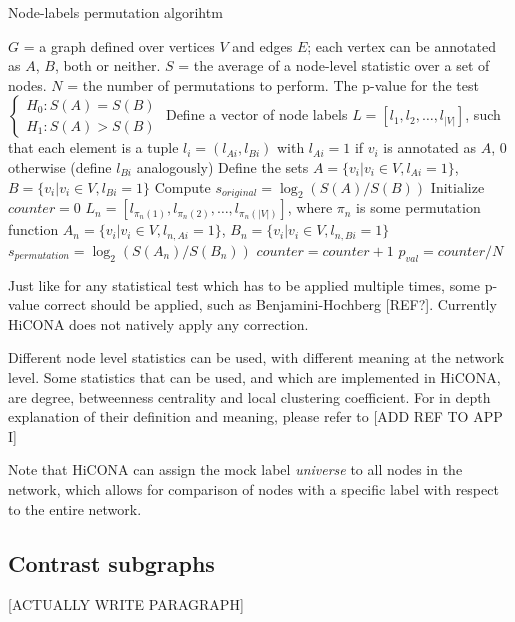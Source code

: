 \begin{algorithm}
\caption{Node-labels permutation algorihtm}\label{alg:labelPermutations}
\begin{algorithmic}[1]
\Require $G$ = a graph defined over vertices $V$ and edges $E$; each vertex can be annotated as $A$, $B$, both or neither. $S$ = the average of a node-level statistic over a set of nodes. $N$ = the number of permutations to perform.
\Ensure The p-value for the test $\begin{cases} H_0: S(A) = S(B) \\ H_1: S(A) > S(B) \end{cases}$
\State Define a vector of node labels $L = \left[l_1, l_2, \dots, l_{|V|}\right]$, such that each element is a tuple $l_i = (l_{Ai}, l_{Bi})$ with $l_{Ai} = 1$ if $v_i$ is annotated as $A$, 0 otherwise (define $l_{Bi}$ analogously)
\State Define the sets $A = \{v_i | v_i \in V, l_{Ai} = 1\}$, $B = \{v_i | v_i \in V, l_{Bi} = 1\}$
\State Compute $s_{original} = \log_2(S(A)/S(B))$
\State Initialize $counter = 0$ 
    \State $L_n = [l_{\pi_n(1)}, l_{\pi_n(2)}, \dots, l_{\pi_n(|V|)}]$, where $\pi_n$ is some permutation function
    \State $A_n = \{v_i | v_i \in V, l_{n, Ai}=1\}$, $B_n = \{v_i | v_i \in V, l_{n, Bi}=1\}$
    \State $s_{permutation} = \log_2(S(A_n)/S(B_n))$
        \State $counter = counter + 1$
    \EndIf
\EndFor
\State $p_{val} = counter / N$
\end{algorithmic}
\end{algorithm}

Just like for any statistical test which has to be applied multiple times, some p-value correct should be applied, such as Benjamini-Hochberg [REF?]. Currently HiCONA does not natively apply any correction.

Different node level statistics can be used, with different meaning at the network level. Some statistics that can be used, and which are implemented in HiCONA, are degree, betweenness centrality and local clustering coefficient. For in depth explanation of their definition and meaning, please refer to [ADD REF TO APP I]

Note that HiCONA can assign the mock label \emph{universe} to all nodes in the network, which allows for comparison of nodes with a specific label with respect to the entire network.

\subsection{Contrast subgraphs}
[ACTUALLY WRITE PARAGRAPH]

